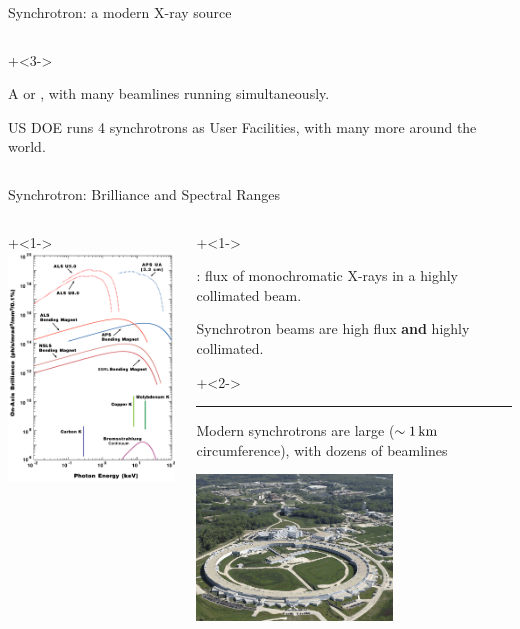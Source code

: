 \begin{slide}{Synchrotron: a modern X-ray source}
\begin{columns}
\begin{column}{60mm}
        {\onslide+<3-> {
           \vmm\vmm
           A {} or {}, with many
           beamlines running simultaneously.
           
           \vmm US DOE runs 4 synchrotrons as User Facilities, with many
           more around the world.
           }}
         \end{column}
       \end{columns}


    \vmm \vfill


\end{slide}


\begin{slide}{Synchrotron: Brilliance and Spectral Ranges}

\vmm
\begin{columns}[T]
  \begin{column}{57mm}
    \onslide+<1-> {
      \includegraphics[width=57mm]{figs/misc/APS_und_spectra}
      }
    \end{column}
    \begin{column}{80mm}
    \onslide+<1->{

      {}: flux of monochromatic X-rays in a highly
      collimated beam.

      \vmm
      Synchrotron beams are high flux {\bf{and}} highly collimated.
      
      }

      \onslide+<2->
      \vmm      \hrule       \vmm

      Modern synchrotrons are large ($\sim 1 \rm \, km$
      circumference), with dozens of beamlines

      \vmm
    \begin{center}      
      \includegraphics[width=52mm]{figs/misc/APS_aerial1}
    \end{center}


\end{column}
\end{columns}
\end{slide}
